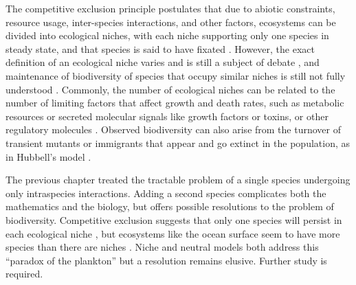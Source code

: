 The competitive exclusion principle postulates that due to abiotic constraints, resource usage, inter-species interactions, and other factors, ecosystems can be divided into ecological niches, with each niche supporting only one species in steady state, and that species is said to have fixated \cite{Hardin1960,Mayfield2010,Kimura1968,Nadell2013}. 
However, the exact definition of an ecological niche varies and is still a subject of debate \cite{Leibold1995,Hutchinson1961,Abrams1980,Chesson2000,Adler2010,Capitan2017,Fisher2014}, and maintenance of biodiversity of species that occupy similar niches is still not fully understood \cite{May1999,Pennisi2005,Posfai2017}. 
Commonly, the number of ecological niches can be related to the number of limiting factors that affect growth and death rates, such as metabolic resources or secreted molecular signals like growth factors or toxins, or other regulatory molecules \cite{Armstrong1976,McGehee1977a,Armstrong1980,Posfai2017}. 
Observed biodiversity can also arise from the turnover of transient mutants or immigrants that appear and go extinct in the population, as in Hubbell's model \cite{Hubbell2001,Desai2007,Carroll2015}.
\fi

The previous chapter treated the tractable problem of a single species undergoing only intraspecies interactions. 
Adding a second species complicates both the mathematics and the biology, but offers possible resolutions to the problem of biodiversity. 
Competitive exclusion suggests that only one species will persist in each ecological niche \cite{competitive ???}, but ecosystems like the ocean surface seem to have more species than there are niches \cite{Hutchinson1961}. %
Niche and neutral models both address this ``paradox of the plankton'' but a resolution remains elusive. 
Further study is required. 


